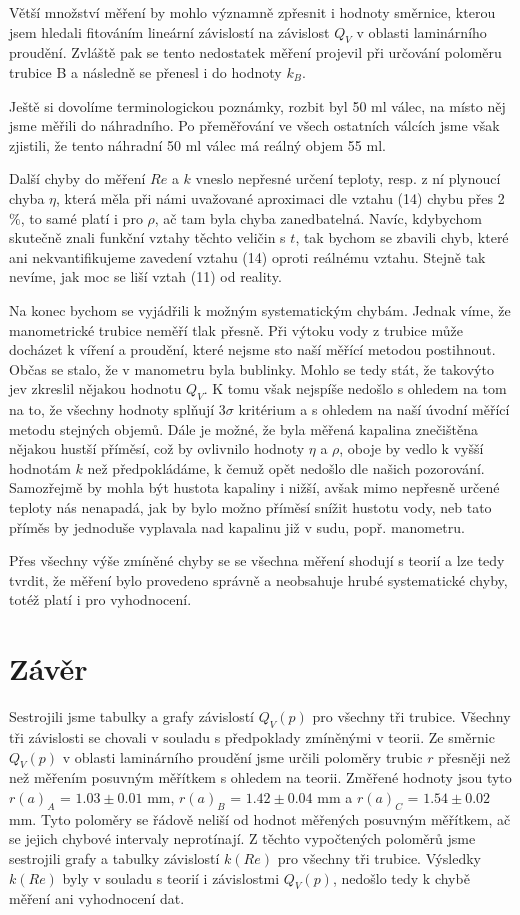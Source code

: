 \documentclass[a4paper]{article}
\begin{document}
\par Větší množství měření by mohlo významně zpřesnit i hodnoty směrnice, kterou jsem hledali fitováním lineární závislostí na závislost $Q_{V}$ v oblasti laminárního proudění. Zvláště pak se tento nedostatek měření projevil při určování poloměru trubice B a následně se přenesl i do hodnoty $k_{B}$.
\par Ještě si dovolíme terminologickou poznámky, rozbit byl 50 ml válec, na místo něj jsme měřili do náhradního. Po přeměřování ve všech ostatních válcích jsme však zjistili, že tento náhradní 50 ml válec má reálný objem 55 ml.
\par Další chyby do měření $Re$ a $k$  vneslo nepřesné určení teploty, resp. z ní plynoucí chyba $\eta$, která měla při námi uvažované aproximaci dle vztahu (14) chybu přes 2 $\%$, to samé platí i pro $\rho$, ač tam byla chyba zanedbatelná. Navíc, kdybychom skutečně znali funkční vztahy těchto veličin s $t$, tak bychom se zbavili chyb, které ani nekvantifikujeme zavedení vztahu (14) oproti reálnému vztahu. Stejně tak nevíme, jak moc se liší vztah (11) od reality.
\par Na konec bychom se vyjádřili k možným systematickým chybám. Jednak víme, že manometrické trubice neměří tlak přesně. Při výtoku vody z trubice může docházet k víření a proudění, které nejsme sto naší měřící metodou postihnout. Občas se stalo, že v manometru byla bublinky. Mohlo se tedy stát, že takovýto jev zkreslil nějakou hodnotu $Q_{V}$. K tomu však nejspíše nedošlo s ohledem na tom na to, že všechny hodnoty splňují $3 \sigma$ kritérium a s ohledem na naší úvodní měřící metodu stejných objemů. Dále je možné, že byla měřená kapalina znečištěna nějakou hustší příměsí, což by ovlivnilo hodnoty $\eta$ a $\rho$, oboje by vedlo k vyšší hodnotám $k$ než předpokládáme, k čemuž opět nedošlo dle našich pozorování. Samozřejmě by mohla být hustota kapaliny i nižší, avšak mimo nepřesně určené teploty nás nenapadá, jak by bylo možno příměsí snížit hustotu vody, neb tato příměs by jednoduše vyplavala nad kapalinu již v sudu, popř. manometru.
\par Přes všechny výše zmíněné chyby se se všechna měření shodují s teorií a lze tedy tvrdit, že měření bylo provedeno správně a neobsahuje hrubé systematické chyby, totéž platí i pro vyhodnocení.
\section*{Závěr}
\par Sestrojili jsme tabulky a grafy závislostí $Q_{V}(p)$ pro všechny tři trubice. Všechny tři závislosti se chovali v souladu s předpoklady zmíněnými v teorii. Ze směrnic $Q_{V}(p)$ v oblasti laminárního proudění jsme určili poloměry trubic $r$ přesněji než než měřením posuvným měřítkem s ohledem na teorii. Změřené hodnoty jsou tyto $r(a)_{A}$ = $1.03\pm0.01$ mm, $r(a)_{B}$ = $1.42\pm0.04$ mm a $r(a)_{C}$ = $1.54\pm0.02$ mm. Tyto poloměry se řádově neliší od hodnot měřených posuvným měřítkem, ač se jejich chybové intervaly neprotínají. Z těchto vypočtených poloměrů jsme sestrojili grafy a tabulky závislostí $k(Re)$ pro všechny tři trubice. Výsledky $k(Re)$ byly v souladu s teorií i závislostmi $Q_{V}(p)$, nedošlo tedy k chybě měření ani vyhodnocení dat. 
\end{document}

